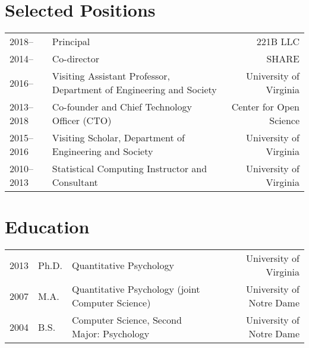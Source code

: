 \documentclass[11pt]{article}
\begin{document}
\maketitle


\section*{Selected Positions}
\begin{tabularx}{\textwidth}{l X r}
2018--				& Principal & 221B LLC\\
2014-- 			& Co-director & SHARE \\
2016--				& Visiting Assistant Professor, Department of Engineering and Society & University of Virginia \\
2013--2018 			& Co-founder and Chief Technology Officer (CTO) & Center for Open Science\\
2015--2016		& Visiting Scholar, Department of Engineering and Society & University of Virginia \\
2010--2013 	& Statistical Computing Instructor and Consultant &  University of Virginia\\
\end{tabularx}

\section*{Education}
\begin{tabularx}{\textwidth}{llXr}
2013	& Ph.D.		& Quantitative Psychology                     					& University of Virginia\\
2007 	& M.A.		& Quantitative Psychology (joint Computer Science)	& University of Notre Dame\\
2004 	& B.S.		& Computer Science, Second Major: Psychology    		& University of Notre Dame\\
\end{tabularx}
\end{document}

